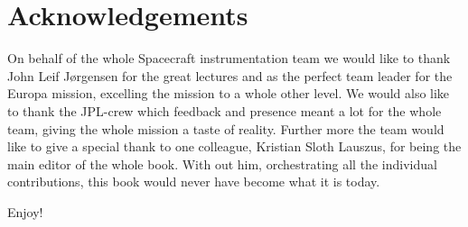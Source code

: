 \chapter{Acknowledgements}
On behalf of the whole Spacecraft instrumentation team we would like to thank John Leif Jørgensen for the great lectures and as the perfect team leader for the Europa mission, excelling the mission to a whole other level. We would also like to thank the JPL-crew which feedback and presence meant a lot for the whole team, giving the whole mission a taste of reality.
Further more the team would like to give a special thank to one colleague, Kristian Sloth Lauszus, for being the main editor of the whole book. With out him, orchestrating all the individual contributions, this book would never have become what it is today.  

Enjoy!